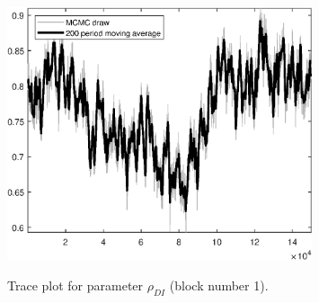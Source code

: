 \begin{figure}[H]
\centering
  \includegraphics[width=0.8\textwidth]{BRS_gen/graphs/TracePlot_rho_DI_blck_1}\\
    \caption{Trace plot for parameter ${\rho_{DI}}$ (block number 1).}
\end{figure}
